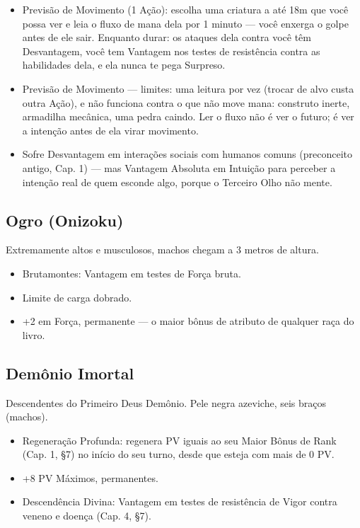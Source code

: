 \begin{itemize}
  \item Previsão de Movimento (1 Ação): escolha uma criatura a até 18m que você possa ver e leia o fluxo de mana dela por 1 minuto --- você enxerga o golpe antes de ele sair. Enquanto durar: os ataques dela contra você têm Desvantagem, você tem Vantagem nos testes de resistência contra as habilidades dela, e ela nunca te pega Surpreso.
  \item Previsão de Movimento --- limites: uma leitura por vez (trocar de alvo custa outra Ação), e não funciona contra o que não move mana: construto inerte, armadilha mecânica, uma pedra caindo. Ler o fluxo não é ver o futuro; é ver a intenção antes de ela virar movimento.
  \item Sofre Desvantagem em interações sociais com humanos comuns (preconceito antigo, Cap. 1) --- mas Vantagem Absoluta em Intuição para perceber a intenção real de quem esconde algo, porque o Terceiro Olho não mente.
\end{itemize}

\subsection{Ogro (Onizoku)}
Extremamente altos e musculosos, machos chegam a 3 metros de altura.

\begin{itemize}
  \item Brutamontes: Vantagem em testes de Força bruta.
  \item Limite de carga dobrado.
  \item +2 em Força, permanente --- o maior bônus de atributo de qualquer raça do livro.
\end{itemize}

\subsection{Demônio Imortal}
Descendentes do Primeiro Deus Demônio. Pele negra azeviche, seis braços (machos).

\begin{itemize}
  \item Regeneração Profunda: regenera PV iguais ao seu Maior Bônus de Rank (Cap. 1, §7) no início do seu turno, desde que esteja com mais de 0 PV.
  \item +8 PV Máximos, permanentes.
  \item Descendência Divina: Vantagem em testes de resistência de Vigor contra veneno e doença (Cap. 4, §7).
\end{itemize}

